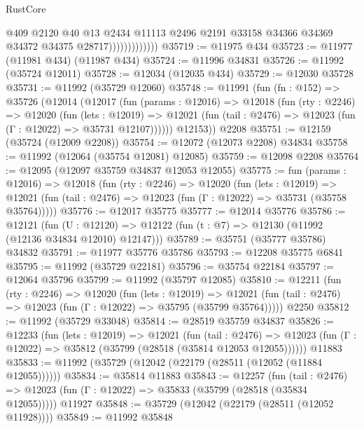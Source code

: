 \begin{lexlean}{RustCore}
\begin{coremodule}
                              @409
                              @2120
                              @40
                              @13
                              @2434
                              @11113
                              @2496
                              @2191
                              @33158
                              @34366
                              @34369
                              @34372
                              @34375
                              @28717)))))))))))))
@35719 := @11975 @434
@35723 := @11977 (@11981 @434) (@11987 @434)
@35724 := @11996 @34831
@35726 := @11992 (@35724 @12011)
@35728 := @12034 (@12035 @434)
@35729 := @12030 @35728
@35731 := @11992 (@35729 @12060)
@35748 := @11991
    (fun (fn : @152) =>
    @35726
      (@12014
        (@12017
          (fun (params : @12016) =>
          @12018
            (fun (rty : @2246) =>
            @12020
              (fun (lets : @12019) =>
              @12021 (fun (tail : @2476) => @12023 (fun (Γ : @12022) => @35731 @12107))))))
        @12153))
    @2208
@35751 := @12159 (@35724 (@12009 @2208))
@35754 := @12072 (@12073 @2208) @34834
@35758 := @11992 (@12064 (@35754 @12081) @12085)
@35759 := @12098 @2208
@35764 := @12095 (@12097 @35759 @34837 @12053 @12055)
@35775 := fun (params : @12016) =>
  @12018
    (fun (rty : @2246) =>
    @12020
      (fun (lets : @12019) =>
      @12021 (fun (tail : @2476) => @12023 (fun (Γ : @12022) => @35731 (@35758 @35764)))))
@35776 := @12017 @35775
@35777 := @12014 @35776
@35786 := @12121
    (fun (U : @12120) => @12122 (fun (t : @7) => @12130 (@11992 (@12136 @34834 @12010) @12147)))
@35789 := @35751 (@35777 @35786) @34832
@35791 := @11977 @35776 @35786
@35793 := @12208 @35775 @6841
@35795 := @11992 (@35729 @22181)
@35796 := @35754 @22184
@35797 := @12064 @35796
@35799 := @11992 (@35797 @12085)
@35810 := @12211
    (fun (rty : @2246) =>
    @12020
      (fun (lets : @12019) =>
      @12021 (fun (tail : @2476) => @12023 (fun (Γ : @12022) => @35795 (@35799 @35764)))))
    @2250
@35812 := @11992 (@35729 @33048)
@35814 := @28519 @35759 @34837
@35826 := @12233
    (fun (lets : @12019) =>
    @12021
      (fun (tail : @2476) =>
      @12023 (fun (Γ : @12022) => @35812 (@35799 (@28518 (@35814 @12053 @12055))))))
    @11883
@35833 := @11992 (@35729 (@12042 (@22179 (@28511 (@12052 (@11884 @12055))))))
@35834 := @35814 @11883
@35843 := @12257
    (fun (tail : @2476) => @12023 (fun (Γ : @12022) => @35833 (@35799 (@28518 (@35834 @12055)))))
    @11927
@35848 := @35729 (@12042 (@22179 (@28511 (@12052 @11928))))
@35849 := @11992 @35848

\end{coremodule}
\end{lexlean}
